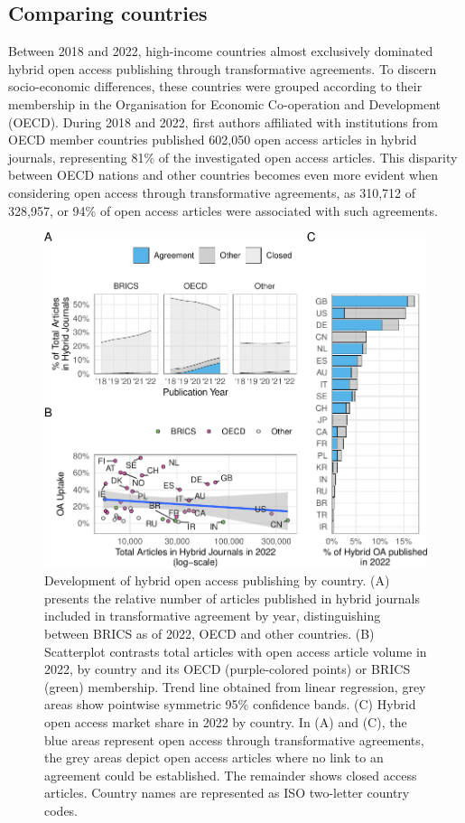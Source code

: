 \documentclass[a4paper,man,floatsintext,longtable,noextraspace,12pt]{apa6}
\begin{document}
\subsection{Comparing countries}\label{comparing-countries}

Between 2018 and 2022, high-income countries almost exclusively
dominated hybrid open access publishing through transformative
agreements. To discern socio-economic differences, these countries were
grouped according to their membership in the Organisation for Economic
Co-operation and Development (OECD). During 2018 and 2022, first authors
affiliated with institutions from OECD member countries published
602,050 open access articles in hybrid journals, representing 81\% of
the investigated open access articles. This disparity between OECD
nations and other countries becomes even more evident when considering
open access through transformative agreements, as 310,712 of 328,957, or
94\% of open access articles were associated with such agreements.

\begin{figure}[ht!]

{\centering \includegraphics[width=0.99\linewidth,]{fig/country_patch-1} 

}

\caption{Development of hybrid open access publishing by country. (A) presents the relative number of articles published in hybrid journals included in transformative agreement by year, distinguishing between BRICS as of 2022, OECD and other countries. (B) Scatterplot contrasts total articles with open access article volume in 2022, by country and its OECD (purple-colored points) or BRICS (green) membership. Trend line obtained from linear regression, grey areas show pointwise symmetric 95\% confidence bands. (C) Hybrid open access market share in 2022 by country. In (A) and (C), the blue areas represent open access through transformative agreements, the grey areas depict open access articles where no link to an agreement could be established. The remainder shows closed access articles. Country names are represented as ISO two-letter country codes.}\label{fig:country_patch}
\end{figure}
\end{document}
